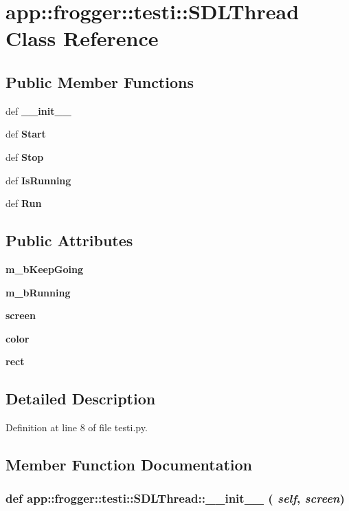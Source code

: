 \section{app::frogger::testi::SDLThread Class Reference}
\label{classapp_1_1frogger_1_1testi_1_1SDLThread}
\subsection*{Public Member Functions}
\begin{CompactItemize}
\item 
def {\bf \_\-\_\-init\_\-\_\-}
\item 
def {\bf Start}
\item 
def {\bf Stop}
\item 
def {\bf IsRunning}
\item 
def {\bf Run}
\end{CompactItemize}
\subsection*{Public Attributes}
\begin{CompactItemize}
\item 
{\bf m\_\-bKeepGoing}
\item 
{\bf m\_\-bRunning}
\item 
{\bf screen}
\item 
{\bf color}
\item 
{\bf rect}
\end{CompactItemize}


\subsection{Detailed Description}


Definition at line 8 of file testi.py.

\subsection{Member Function Documentation}
\subsubsection{\setlength{\rightskip}{0pt plus 5cm}def app::frogger::testi::SDLThread::\_\-\_\-init\_\-\_\- ( {\em self},  {\em screen})}\label{classapp_1_1frogger_1_1testi_1_1SDLThread_1818c9f6ab7666735abc441426693f0b}




